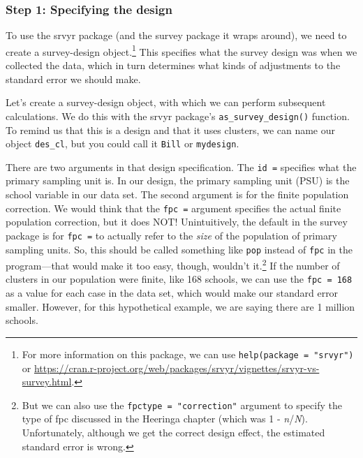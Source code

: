 \documentclass[
]{article}
\newenvironment{Shaded}{\begin{snugshade}}{\end{snugshade}}
\newcommand{\DataTypeTok}[1]{\textcolor[rgb]{0.13,0.29,0.53}{#1}}
\newcommand{\KeywordTok}[1]{\textcolor[rgb]{0.13,0.29,0.53}{\textbf{#1}}}
\newcommand{\NormalTok}[1]{#1}
\newcommand{\OperatorTok}[1]{\textcolor[rgb]{0.81,0.36,0.00}{\textbf{#1}}}
\newcommand{\StringTok}[1]{\textcolor[rgb]{0.31,0.60,0.02}{#1}}
\begin{document}
\hypertarget{step-1-specifying-the-design}{%
\subsubsection{Step 1: Specifying the design}\label{step-1-specifying-the-design}}

To use the srvyr package (and the survey package it wraps around), we need to create a survey-design object.\footnote{For more information on this package, we can use \texttt{help(package\ =\ "srvyr")} or \url{https://cran.r-project.org/web/packages/srvyr/vignettes/srvyr-vs-survey.html}.} This specifies what the survey design was when we collected the data, which in turn determines what kinds of adjustments to the standard error we should make.

Let's create a survey-design object, with which we can perform subsequent calculations. We do this with the srvyr package's \texttt{as\_survey\_design()} function. To remind us that this is a design and that it uses clusters, we can name our object \texttt{des\_cl}, but you could call it \texttt{Bill} or \texttt{mydesign}.

\begin{Shaded}
\end{Shaded}

There are two arguments in that design specification. The \texttt{id\ =} specifies what the primary sampling unit is. In our design, the primary sampling unit (PSU) is the school variable in our data set. The second argument is for the finite population correction. We would think that the \texttt{fpc\ =} argument specifies the actual finite population correction, but it does NOT! Unintuitively, the default in the survey package is for \texttt{fpc\ =} to actually refer to the \emph{size} of the population of primary sampling units. So, this should be called something like \texttt{pop} instead of \texttt{fpc} in the program---that would make it too easy, though, wouldn't it.\footnote{But we can also use the \texttt{fpctype\ =\ "correction"} argument to specify the type of fpc discussed in the Heeringa chapter (which was 1 - \emph{n}/\emph{N}). Unfortunately, although we get the correct design effect, the estimated standard error is wrong.} If the number of clusters in our population were finite, like 168 schools, we can use the \texttt{fpc\ =\ 168} as a value for each case in the data set, which would make our standard error smaller. However, for this hypothetical example, we are saying there are 1 million schools.
\end{document}

